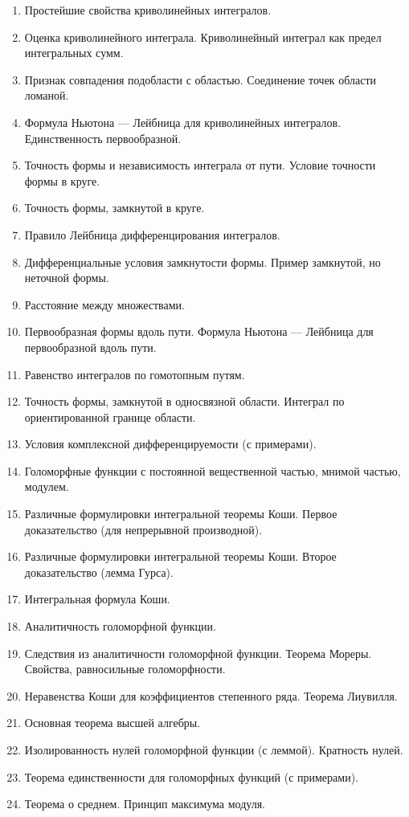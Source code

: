\documentclass[12pt, a4paper]{book}
\begin{document}
\begin{enumerate}
\item Простейшие свойства криволинейных интегралов.
\item Оценка криволинейного интеграла. Криволинейный интеграл как предел интегральных сумм.
\item Признак совпадения подобласти с областью. Соединение точек области ломаной.
\item Формула Ньютона — Лейбница для криволинейных интегралов. Единственность первообразной.
\item Точность формы и независимость интеграла от пути. Условие точности формы в круге.
\item Точность формы, замкнутой в круге.
\item Правило Лейбница дифференцирования интегралов.
\item Дифференциальные условия замкнутости формы. Пример замкнутой, но неточной формы.
\item Расстояние между множествами.
\item Первообразная формы вдоль пути. Формула Ньютона — Лейбница для первообразной вдоль пути.
\item Равенство интегралов по гомотопным путям.
\item Точность формы, замкнутой в односвязной области. Интеграл по ориентированной границе области.
\item Условия комплексной дифференцируемости (с примерами).
\item Голоморфные функции с постоянной вещественной частью, мнимой частью, модулем.
\item Различные формулировки интегральной теоремы Коши. Первое доказательство (для непрерывной производной).
\item Различные формулировки интегральной теоремы Коши. Второе доказательство (лемма Гурса).
\item Интегральная формула Коши.
\item Аналитичность голоморфной функции.
\item Следствия из аналитичности голоморфной функции. Теорема Мореры. Свойства, равносильные голоморфности.
\item Неравенства Коши для коэффициентов степенного ряда. Теорема Лиувилля.
\item Основная теорема высшей алгебры.
\item Изолированность нулей голоморфной функции (с леммой). Кратность нулей.
\item Теорема единственности для голоморфных функций (с примерами).
\item Теорема о среднем. Принцип максимума модуля.

\end{enumerate}
\end{document}
